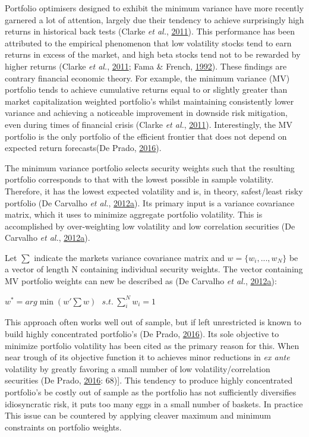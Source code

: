 \documentclass[11pt,preprint, authoryear]{elsarticle}
\numberwithin{equation}{section}
\numberwithin{figure}{section}
\numberwithin{table}{section}
\begin{document}
Portfolio optimisers designed to exhibit the minimum variance have more
recently garnered a lot of attention, largely due their tendency to
achieve surprisingly high returns in historical back tests (Clarke
\emph{et al.}, \protect\hyperlink{ref-clarke2011}{2011}). This
performance has been attributed to the empirical phenomenon that low
volatility stocks tend to earn returns in excess of the market, and high
beta stocks tend not to be rewarded by higher returns (Clarke \emph{et
al.}, \protect\hyperlink{ref-clarke2011}{2011}; Fama \& French,
\protect\hyperlink{ref-fama1992}{1992}). These findings are contrary
financial economic theory. For example, the minimum variance (MV)
portfolio tends to achieve cumulative returns equal to or slightly
greater than market capitalization weighted portfolio's whilst
maintaining consistently lower variance and achieving a noticeable
improvement in downside risk mitigation, even during times of financial
crisis (Clarke \emph{et al.}, \protect\hyperlink{ref-clarke2011}{2011}).
Interestingly, the MV portfolio is the only portfolio of the efficient
frontier that does not depend on expected return forecasts(De Prado,
\protect\hyperlink{ref-lopez}{2016}).

The minimum variance portfolio selects security weights such that the
resulting portfolio corresponds to that with the lowest possible in
sample volatility. Therefore, it has the lowest expected volatility and
is, in theory, safest/least risky portfolio (De Carvalho \emph{et al.},
\protect\hyperlink{ref-rawl2012}{2012}\protect\hyperlink{ref-rawl2012}{a}).
Its primary input is a variance covariance matrix, which it uses to
minimize aggregate portfolio volatility. This is accomplished by
over-weighting low volatility and low correlation securities (De
Carvalho \emph{et al.},
\protect\hyperlink{ref-rawl2012}{2012}\protect\hyperlink{ref-rawl2012}{a}).

Let \(\sum\) indicate the markets variance covariance matrix and
\(w=\{w_i,..., w_N \}\) be a vector of length N containing individual
security weights. The vector containing MV portfolio weights can new be
described as (De Carvalho \emph{et al.},
\protect\hyperlink{ref-rawl2012}{2012}\protect\hyperlink{ref-rawl2012}{a}):

\begin{center}
$w^*=arg\min(w'\sum w)\ \ \ s.t.\ \sum^N_iw_i=1$ 
\end{center}

This approach often works well out of sample, but if left unrestricted
is known to build highly concentrated portfolio's (De Prado,
\protect\hyperlink{ref-lopez}{2016}). Its sole objective to minimize
portfolio volatility has been cited as the primary reason for this. When
near trough of its objective function it to achieves minor reductions in
\emph{ex ante} volatility by greatly favoring a small number of low
volatility/correlation securities (De Prado,
\protect\hyperlink{ref-lopez}{2016}: 68){]}. This tendency to produce
highly concentrated portfolio's be costly out of sample as the portfolio
has not sufficiently diversifies idiosyncratic risk, it puts too many
eggs in a small number of baskets. In practice This issue can be
countered by applying cleaver maximum and minimum constraints on
portfolio weights.
\end{document}
